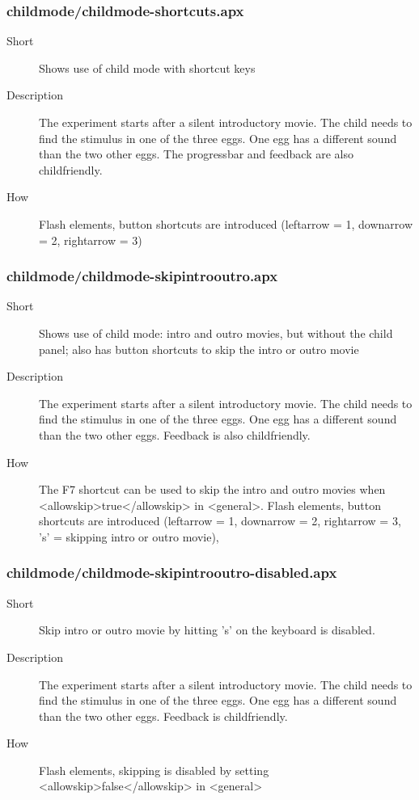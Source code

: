 \subsubsection{childmode/childmode-shortcuts.apx}
\begin{description}
\item[Short] 
 Shows use of child mode with shortcut keys
\item[Description] 
 The experiment starts after a silent introductory movie. The child needs to find the stimulus in one of the three eggs. One egg has a different sound than the two other eggs. The progressbar and feedback are also childfriendly.
\item[How] 
 Flash elements, button shortcuts are introduced (leftarrow = 1, downarrow = 2, rightarrow = 3)
\end{description}

\subsubsection{childmode/childmode-skipintrooutro.apx}
\begin{description}
\item[Short] 
 Shows use of child mode: intro and outro movies, but without the child panel; also has button shortcuts to skip the intro or outro movie
\item[Description] 
 The experiment starts after a silent introductory movie. The child needs to find the stimulus in one of the three eggs. One egg has a different sound than the two other eggs. Feedback is also childfriendly.
\item[How] 
 The F7 shortcut can be used to skip the intro and outro movies when \textless{}allowskip\textgreater{}true\textless{}/allowskip\textgreater{} in \textless{}general\textgreater{}. Flash elements, button shortcuts are introduced (leftarrow = 1, downarrow = 2, rightarrow = 3, 's' = skipping intro or outro movie),
\end{description}

\subsubsection{childmode/childmode-skipintrooutro-disabled.apx}
\begin{description}
\item[Short] 
 Skip intro or outro movie by hitting 's' on the keyboard is disabled.
\item[Description] 
 The experiment starts after a silent introductory movie. The child needs to find the stimulus in one of the three eggs. One egg has a different sound than the two other eggs. Feedback is childfriendly.
\item[How] 
 Flash elements, skipping is disabled by setting  \textless{}allowskip\textgreater{}false\textless{}/allowskip\textgreater{} in \textless{}general\textgreater{}
\end{description}

